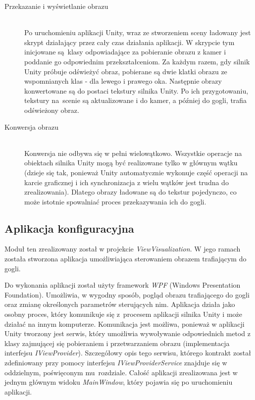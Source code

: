 \documentclass[a4paper,11pt,twoside]{report}
\theoremstyle{definition}
\begin{document}
\begin{description}
\item [Przekazanie i wyświetlanie obrazu] \hfill \\
Po uruchomieniu aplikacji Unity, wraz ze stworzeniem sceny ładowany jest skrypt działający przez cały czas działania aplikacji. W skrypcie tym inicjowane są~klasy odpowiadające za pobieranie obrazu z kamer i poddanie go odpowiednim przekształceniom. Za każdym razem, gdy silnik Unity próbuje odświeżyć obraz, pobierane są dwie klatki obrazu ze wspomnianych klas - dla lewego i prawego oka. Następnie obrazy konwertowane są do postaci tekstury silnika Unity. Po ich przygotowaniu, tekstury na~scenie są aktualizowane i do kamer, a później do gogli, trafia odświeżony obraz.
\item [Konwersja obrazu] \hfill \\
Konwersja nie odbywa się w pełni wielowątkowo. Wszystkie operacje na obiektach silnika Unity mogą być realizowane tylko w głównym wątku (dzieje się tak, ponieważ Unity automatycznie wykonuje część operacji na karcie graficznej i ich synchronizacja z wielu wątków jest trudna do zrealizowania). Dlatego obrazy ładowane są do tekstur pojedynczo, co może istotnie spowalniać proces przekazywania ich do gogli.
\end{description}

\subsection{Aplikacja konfiguracyjna}
Moduł ten zrealizowany został w projekcie \textit{ViewVisualization}. W jego ramach została stworzona aplikacja umożliwiająca sterowaniem obrazem trafiającym do gogli.

Do wykonania aplikacji został użyty framework \textit{WPF} (Windows Presentation Foundation). Umożliwia, w wygodny sposób, pogląd obrazu trafiającego do gogli oraz zmianę określonych parametrów sterujących nim. Aplikacja działa jako osobny proces, który komunikuje się z~procesem aplikacji silnika Unity i może działać na innym komputerze. Komunikacja jest możliwa, ponieważ w aplikacji Unity tworzony jest serwis, który umożliwia wywoływanie odpowiednich metod z klasy zajmującej się pobieraniem i przetwarzaniem obrazu (implementacja interfejsu \textit{IViewProvider}). Szczegółowy opis tego serwisu, którego kontrakt został zdefiniowany przy pomocy interfejsu \textit{IViewProviderService} znajduje się w oddzielnym, poświęconym mu~rozdziale. Całość aplikacji zrealizowana jest w jednym głównym widoku \textit{MainWindow}, który pojawia się po uruchomieniu aplikacji. 
\end{document}
